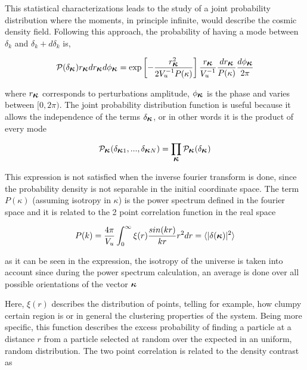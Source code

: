 This statistical characterizations leads to the study of a joint probability 
distribution where the moments, in principle infinite, would describe the 
cosmic density field. 
Following this approach, the probability of having a mode between $\delta_k$ and 
$\delta_{k}+d\delta_k$ is, 

\begin{equation}
\mathcal{P}(\delta_{\mbox{\boldmath$\kappa$}})r_{\mbox{\boldmath$\kappa$}}dr_{\mbox{\boldmath$\kappa$}}d\phi_{\mbox{\boldmath$\kappa$}}
=
\exp\left[-\frac{r_{\mbox{\boldmath$\kappa$}}^2}{2V_u^{-1}P(\kappa)}\right]	\frac{r_{\mbox{\boldmath$\kappa$}}}{V_u^{-1}}
\frac{dr_{\mbox{\boldmath$\kappa$}}}{P(\kappa)}\frac{d\phi_{\mbox{\boldmath$\kappa$}}}{2\pi}
\label{probabilidad}
\end{equation}


where $r_{\mbox{\boldmath$\kappa$}}$ corresponds to perturbations amplitude,  $\phi_{\mbox{\boldmath$\kappa$}}$ 
is the phase and varies between $[0,2\pi)$.  The joint probability distribution function 
is useful because it allows the independence of the terms $\delta_{\mbox{\boldmath$\kappa$}}$, 
or in other words it is the product of every mode

\[
\mathcal{P}_{\mbox{\boldmath$\kappa$}}(\delta_{\mbox{\boldmath$\kappa$}1},...,\delta_{\mbox{\boldmath$\kappa$}N})=
\prod_{\mbox{\boldmath$\kappa$}}\mathcal{P}_{\mbox{\boldmath$\kappa$}}(\delta_{\mbox{\boldmath$\kappa$}})
\]


This expression is not satisfied when the inverse fourier transform is done, since the 
probability density is not separable in the initial coordinate space. The term $P(\kappa)$ 
(assuming isotropy in \mbox{\boldmath$\kappa$}) is the power spectrum defined in the 
fourier space and it is related to the 2 point correlation function in the real space

\begin{equation}
P(k) = \frac{4\pi}{V_u}\int_0^\infty \xi (r)\frac{sin(kr)}{kr}r^2dr =  \langle|\delta(\mbox{\boldmath$\kappa$})|^2\rangle
\label{pk}
\end{equation}

as it can be seen in the expression, the isotropy of the universe is taken into account since during the power spectrum calculation, an average is done over all  possible orientations of the vector ${\mbox{\boldmath$\kappa$}}$

Here, $\xi (r)$  describes the distribution of points, telling for example, how clumpy certain region is or in general the clustering properties of the system. Being more specific, this function describes the excess probability of finding a particle at a distance $r$ from a particle selected at random over the expected in an uniform, random distribution. 
The two point correlation is related to the density contrast as

